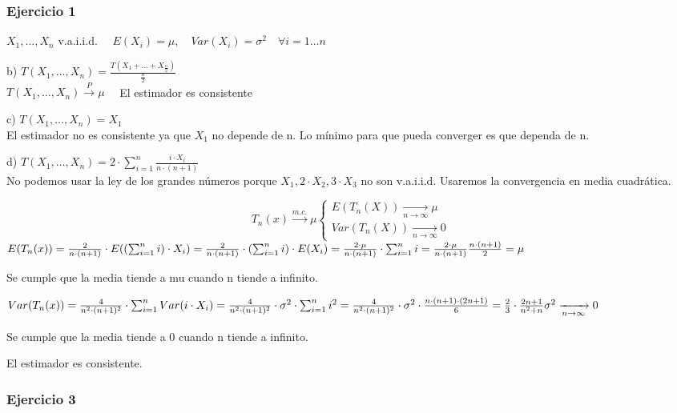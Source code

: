
\setlength{\parskip}{1em}
\subsubsection*{Ejercicio 1}

$X_1, \dots, X_n$ v.a.i.i.d. $\quad E(X_i)=\mu,\quad Var(X_i)=\sigma^2 \quad \forall i=1 \dots n$

b) $T(X_1,\dots,X_n)=\frac{T(X_1 + \dots + X_{\frac{n}{2}})}{\frac{n}{2}}$\\
$T(X_1,\dots,X_n) \xrightarrow{P} \mu \quad$ El estimador es consistente

c) $T(X_1,\dots,X_n)=X_1$\\
El estimador no es consistente ya que $X_1$ no depende de n. Lo mínimo para que
pueda converger es que dependa de n.

d) $T(X_1,\dots,X_n)=2 \cdot \sum_{i=1}^{n}\frac{i \cdot X_i}{n \cdot (n+1)}$\\
No podemos usar la ley de los grandes números porque $X_1, 2 \cdot X_2, 3 \cdot X_3$ no son v.a.i.i.d. Usaremos la convergencia en media cuadrática.

\[
T_n(x) \xrightarrow{m.c.} \mu 
\left\{
\begin{array}{l}
    E(T_n(X)) \xrightarrow[n \to \infty]{} \mu \\
    Var(T_n(X)) \xrightarrow[n \to \infty]{} 0
\end{array}
\right.
\]
\(
E(T_n(x))=\frac{2}{n \cdot (n+1)} \cdot E((\sum_{i=1}^{n} i) \cdot X_i)
=\frac{2}{n \cdot (n+1)} \cdot (\sum_{i=1}^{n} i) \cdot  E(X_i)=
\frac{2 \cdot \mu}{n \cdot (n+1)} \cdot \sum_{i=1}^{n} i \\
=\frac{2 \cdot \mu}{n \cdot (n+1)} \frac{n \cdot (n+1)}{2}= \mu
\)

Se cumple que la media tiende a mu cuando n tiende a infinito.

\(
Var(T_n(x))=\frac{4}{n^2 \cdot (n+1)^2} \cdot \sum_{i=1}^{n} Var(i\cdot X_i)
= \frac{4}{n^2 \cdot (n+1)^2} \cdot \sigma^2 \cdot \sum_{i=1}^{n} i^2 \\
= \frac{4}{n^2 \cdot (n+1)^2} \cdot \sigma^2 \cdot \frac{n \cdot (n+1) \cdot (2n+1)}{6}
=\frac{2}{3}\cdot \frac{2n+1}{n^2+n} \sigma^2 \xrightarrow[n \to \infty]{} 0
\)

Se cumple que la media tiende a 0 cuando n tiende a infinito.

El estimador es consistente.

\subsubsection*{Ejercicio 3}

